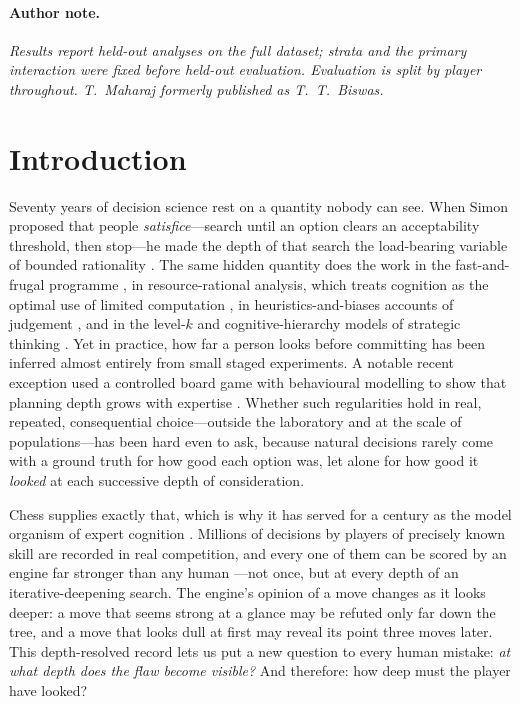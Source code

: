 \paragraph{Author note.}\textit{Results report held-out analyses on the full dataset; strata
and the primary interaction were fixed before held-out evaluation. Evaluation is split by player
throughout. T.~Maharaj formerly published as T.~T.~Biswas.}

\section{Introduction}
Seventy years of decision science rest on a quantity nobody can see. When Simon proposed that
people \emph{satisfice}---search until an option clears an acceptability threshold, then
stop---he made the depth of that search the load-bearing variable of bounded rationality
\citep{simon1955,simon1956}. The same hidden quantity does the work in the fast-and-frugal
programme \citep{gigerenzer1996}, in resource-rational analysis, which treats cognition as
the optimal use of limited computation \citep{russell1991,griffiths2015,lieder2020,callaway2022}, in
heuristics-and-biases accounts of judgement \citep{tversky1974,kahneman1979}, and in the
level-$k$ and cognitive-hierarchy models of strategic thinking
\citep{stahl1995,nagel1995,costagomes2001,camerer2004,costagomes2006,crawford2013,strzalecki2014}.
Yet in practice, how far a person looks before committing has been inferred almost entirely
from small staged experiments. A notable recent exception used a controlled board game with
behavioural modelling to show that planning depth grows with expertise
\citep{vanopheusden2023}. Whether such regularities hold in real, repeated,
consequential choice---outside the laboratory and at the scale of populations---has been hard
even to ask, because natural decisions rarely come with a ground truth for how good each
option was, let alone for how good it \emph{looked} at each successive depth of
consideration.

Chess supplies exactly that, which is why it has served for a century as the model organism
of expert cognition \citep{degroot1965,newell1972,chase1973,gobet1996,ericsson1993}. Millions
of decisions by players of precisely known skill are recorded in real competition, and every
one of them can be scored by an engine far stronger than any human
\citep{campbell2002,silver2018}---not once, but at every depth of an iterative-deepening
search. The engine's opinion of a move changes as it looks deeper: a move that seems strong
at a glance may be refuted only far down the tree, and a move that looks dull at first may
reveal its point three moves later. This depth-resolved record lets us put a new question to
every human mistake: \emph{at what depth does the flaw become visible?} And therefore: how
deep must the player have looked?

